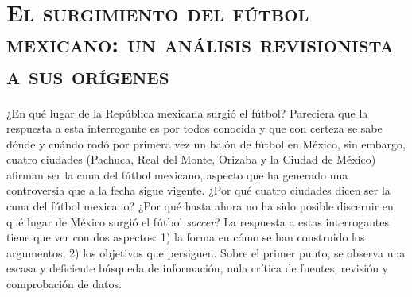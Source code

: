 \documentclass[11pt,a5paper,twoside]{book} %
\begin{document}
\section*{\mdseries\large\textsc{El surgimiento del fútbol mexicano: un análisis revisionista a sus orígenes}}

\noindent ¿En qué lugar de la República mexicana surgió el fútbol? Pareciera que la respuesta a esta
interrogante es por todos conocida y que con certeza se sabe dónde y cuándo rodó por primera
vez un balón de fútbol en México, sin embargo, cuatro ciudades (Pachuca, Real del Monte,
Orizaba y la Ciudad de México) afirman ser la cuna del fútbol mexicano, aspecto que ha
generado una controversia que a la fecha sigue vigente. ¿Por qué cuatro ciudades dicen ser
la cuna del fútbol mexicano? ¿Por qué hasta ahora no ha sido posible discernir en qué lugar
de México surgió el fútbol \emph{soccer}? La respuesta a estas interrogantes tiene que ver con dos
aspectos: 1) la forma en cómo se han construido los argumentos, 2) los objetivos que
persiguen. Sobre el primer punto, se observa una escasa y deficiente búsqueda de
información, nula crítica de fuentes, revisión y comprobación de datos.
\end{document}
